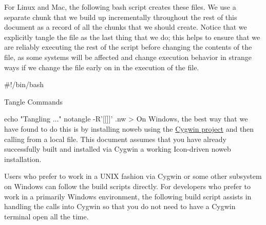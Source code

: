 \documentclass{article}%
\begin{document}
For Linux and Mac, the following bash script creates these files. 
We use a separate chunk that we build up incrementally 
throughout the rest of this document as a record of all the chunks
that we should create.
Notice that we explicitly tangle the {\Tt{}\nwendquote} file as the last
thing that we do;
this helps to ensure that we are reliably executing the rest of the 
script before changing the contents of the file,
as some systems will be affected and change execution behavior 
in strange ways if we change the {\Tt{}\nwendquote} file early on in the 
execution of the file.

\nwenddocs{}\endmoddef\nwstartdeflinemarkup\nwenddeflinemarkup
#!/bin/bash

\LA{}Tangle Commands~{\nwtagstyle{}}\RA{}

echo "Tangling ..."
notangle -R'[[]]' .nw > 
\eatline
\nwnotused{[[TANGLE.sh]]}\nwendcode{}\nwdocspar
On Windows, the best way that we have found to do this is
by installing noweb using the
\href{https://www.cygwin.com/}{Cygwin project}
and then calling {\Tt{}\nwendquote} from a local {\Tt{}\nwendquote} file.
This document assumes that you have already successfully built and
installed via Cygwin a working Icon-driven noweb installation.

Users who prefer to work in a UNIX fashion via Cygwin or some other
subsystem on Windows can follow the build scripts directly.
For developers who prefer to work in a primarily Windows environment,
the following {\Tt{}\nwendquote} build script assists 
in handling the calls into Cygwin
so that you do not need to have a Cygwin terminal open all the time.
\end{document}
